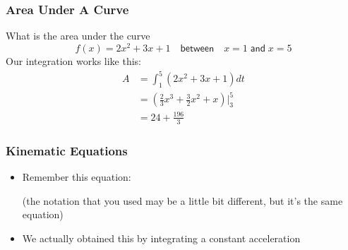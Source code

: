 \documentclass[12pt,compress,aspectratio=169]{beamer}
\begin{document}
\begin{frame}
  \frametitle{Area Under A Curve}
  What is the area under the curve
  \begin{displaymath}
    f(x)=2x^2+3x+1\quad\textsf{between}\quad x=1\;\textsf{and}\;x=5
  \end{displaymath}
  Our integration works like this:
  \begin{align*}
    A&=\int_1^5\left(2x^2+3x+1\right)dt\\
    &=\left(\frac{2}{3}x^3+\frac{3}{2}x^2+x\right)|^5_3\\
    &=24+\frac{196}{3}
  \end{align*}
\end{frame}

\begin{frame}
  \frametitle{Kinematic Equations}
  \begin{itemize}
  \item Remember this equation:

    
    \vspace{-0.1in}(the notation that you used may be a little bit different,
    but it's the same equation)
  \item We actually obtained this by integrating a constant acceleration
  \end{itemize}
\end{frame}
\end{document}
